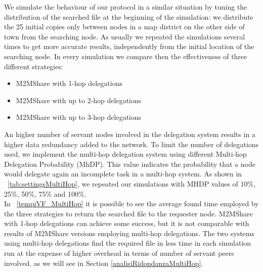 We simulate the behaviour of our protocol in a similar situation by tuning the distribution of the searched file at the beginning of the simulation: we distribute the 25 initial copies only between nodes in a map district on the other side of town from the searching node. As usually we repeated the simulations several times to get more accurate results, independently from the initial location of the searching node. In every simulation we compare then the effectiveness of three different strategies:
\begin{itemize}
\item M2MShare with 1-hop delegations
\item M2MShare with up to 2-hop delegations
\item M2MShare with up to 3-hop delegations
\end{itemize}


An higher number of servant nodes involved in the delegation system results in a higher data redundancy added to the network. To limit the number of delegations used, we implement the multi-hop delegation system using different Multi-hop Delegation Probability (MhDP). This value indicates the probability that a node would delegate again an incomplete task in a multi-hop system. As shown in \tablename~\ref{tab:settingsMultiHop}, we repeated our simulations with MHDP values of 10\%, 25\%, 50\%, 75\% and 100\%.
\\

In \figurename~\ref{tempiVF_MultiHop} it is possible to see the average found time employed  by the three strategies to return the searched file to the requester node. M2MShare with 1-hop delegations can achieve some success, but it is not comparable with results of M2MShare versions employing multi-hop delegations. The two systems using multi-hop delegations find the required file in less time in each simulation run at the expense of higher overhead in terms of number of servant peers involved, as we will see in Section \ref{analisiRidondanzaMultiHop}.

